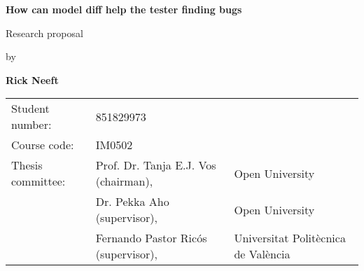 \documentclass{ou-report-vaf}
\begin{document}

\pagestyle{plain}
\begin{titlepage}
\begin{center}


\vspace*{2\bigskipamount}

{\color{red}\Huge\bf How can model diff help the tester finding bugs}
\bigskip

{\large Research proposal}

\bigskip \bigskip
by
\bigskip \bigskip

{\Large\bf Rick Neeft}

\bigskip \bigskip\bigskip \bigskip

\begin{tabular}{lll}
    Student number: & 851829973 \\
    Course code: & \textsc{IM}0502\\
    Thesis committee:
        & Prof. Dr. Tanja E.J. Vos (chairman), & Open University \\
        & Dr. Pekka Aho (supervisor), & Open University \\
        & Fernando Pastor Ricós (supervisor), & Universitat Politècnica de València
\end{tabular}

\end{center}
\end{titlepage}

\let\cleardoublepage\clearpage

\tableofcontents
\newpage

\printglossary[type=\acronymtype]
\newpage

\end{document}
